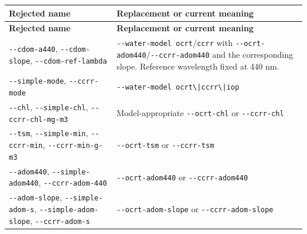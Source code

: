 {\TableFont
\begin{longtable}{@{}>{\raggedright\arraybackslash}p{}>{\raggedright\arraybackslash}p{}@{}}
\toprule
\textbf{Rejected name} & \textbf{Replacement or current meaning} \\
\midrule
\endfirsthead
\toprule
\textbf{Rejected name} & \textbf{Replacement or current meaning} \\
\midrule
\endhead
\bottomrule
\endfoot
\texttt{-\allowbreak{}-\allowbreak{}cdom-\allowbreak{}a440}, \texttt{-\allowbreak{}-\allowbreak{}cdom-\allowbreak{}slope}, \texttt{-\allowbreak{}-\allowbreak{}cdom-\allowbreak{}ref-\allowbreak{}lambda} & \texttt{-\allowbreak{}-\allowbreak{}water-\allowbreak{}model ocrt}/\texttt{ccrr} with \texttt{-\allowbreak{}-\allowbreak{}ocrt-\allowbreak{}adom440}/\texttt{-\allowbreak{}-\allowbreak{}ccrr-\allowbreak{}adom440} and the corresponding slope. Reference wavelength fixed at 440 nm. \\
\texttt{-\allowbreak{}-\allowbreak{}simple-\allowbreak{}mode}, \texttt{-\allowbreak{}-\allowbreak{}ccrr-\allowbreak{}mode} & \texttt{-\allowbreak{}-\allowbreak{}water-\allowbreak{}model ocrt\textbackslash{}|ccrr\allowbreak{}\textbackslash{}|iop} \\
\texttt{-\allowbreak{}-\allowbreak{}chl}, \texttt{-\allowbreak{}-\allowbreak{}simple-\allowbreak{}chl}, \texttt{-\allowbreak{}-\allowbreak{}ccrr-\allowbreak{}chl-\allowbreak{}mg-\allowbreak{}m3} & Model-appropriate \texttt{-\allowbreak{}-\allowbreak{}ocrt-\allowbreak{}chl} or \texttt{-\allowbreak{}-\allowbreak{}ccrr-\allowbreak{}chl} \\
\texttt{-\allowbreak{}-\allowbreak{}tsm}, \texttt{-\allowbreak{}-\allowbreak{}simple-\allowbreak{}min}, \texttt{-\allowbreak{}-\allowbreak{}ccrr-\allowbreak{}min}, \texttt{-\allowbreak{}-\allowbreak{}ccrr-\allowbreak{}min-\allowbreak{}g-\allowbreak{}m3} & \texttt{-\allowbreak{}-\allowbreak{}ocrt-\allowbreak{}tsm} or \texttt{-\allowbreak{}-\allowbreak{}ccrr-\allowbreak{}tsm} \\
\texttt{-\allowbreak{}-\allowbreak{}adom440}, \texttt{-\allowbreak{}-\allowbreak{}simple-\allowbreak{}adom440}, \texttt{-\allowbreak{}-\allowbreak{}ccrr-\allowbreak{}adom-\allowbreak{}440} & \texttt{-\allowbreak{}-\allowbreak{}ocrt-\allowbreak{}adom440} or \texttt{-\allowbreak{}-\allowbreak{}ccrr-\allowbreak{}adom440} \\
\texttt{-\allowbreak{}-\allowbreak{}adom-\allowbreak{}slope}, \texttt{-\allowbreak{}-\allowbreak{}simple-\allowbreak{}adom-\allowbreak{}s}, \texttt{-\allowbreak{}-\allowbreak{}simple-\allowbreak{}adom-\allowbreak{}slope}, \texttt{-\allowbreak{}-\allowbreak{}ccrr-\allowbreak{}adom-\allowbreak{}s} & \texttt{-\allowbreak{}-\allowbreak{}ocrt-\allowbreak{}adom-\allowbreak{}slope} or \texttt{-\allowbreak{}-\allowbreak{}ccrr-\allowbreak{}adom-\allowbreak{}slope} \\

\end{longtable}}
